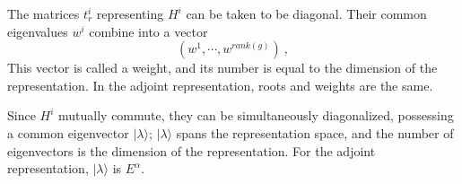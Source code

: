 The matrices $t_{r}^{i}$ representing $H^{i}$ can be taken to be diagonal. Their common eigenvalues $w^{i}$ combine into a vector
\begin{equation}
	(w^{1},\cdots, w^{rank(g)}) \:, \label{11.4.13}
\end{equation}
This vector is called a weight, and its number is equal to the dimension of the representation. In the adjoint representation, roots and weights are the same.
\begin{tcolorbox}[breakable]
	Since $H^{i}$ mutually commute, they can be simultaneously diagonalized, possessing a common eigenvector $\lvert\lambda\rangle$; $\lvert\lambda\rangle$ spans the representation space, and the number of eigenvectors is the dimension of the representation. For the adjoint representation, $\lvert\lambda\rangle$ is $E^{\alpha}$.
\end{tcolorbox}

